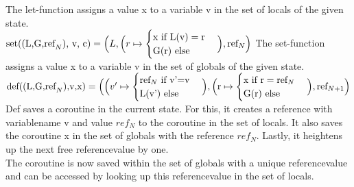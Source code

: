 The let-function assigns a value x to a variable v in the set of locals of the given state.\\
$\text{set((L,G,ref}_N\text{), v, c)} = \Big(L,\Big(r \mapsto 
\begin{cases}
\text{x}  \text{ if } \text{L(v)} = \text{r} \\
\text{G(r)}  \text{ else } \\
\end{cases}\Big),\text{ref}_N\Big)\\$
The set-function assigns a value x to a variable v in the set of globals of the given state.\\
$\text{def((L,G,ref}_N\text{),v,x)} =  \Big(\Big(v' \mapsto 
\begin{cases}
\text{ref}_N  \text{ if } \text{v'=v} \\
\text{L(v')}  \text{ else} \\ 
\end{cases} \Big),\Big( \text{r}\mapsto
\begin{cases}
\text{x} \text{ if } \text{r}=\text{ref}_N\\
\text{G(r)} \text{ else} \\
\end{cases}\Big), \text{ref}_{N+1}\Big) \\$
Def saves a coroutine in the current state. For this, it creates a reference with variablename v and value $ref_N$ to the coroutine in the set of locals. It also saves the coroutine x in the set of globals with the reference $ref_N$. Lastly, it heightens up the next free referencevalue by one.\\
The coroutine is now saved within the set of globals with a unique referencevalue and can be accessed by looking up this referencevalue in the set of locals.\\

